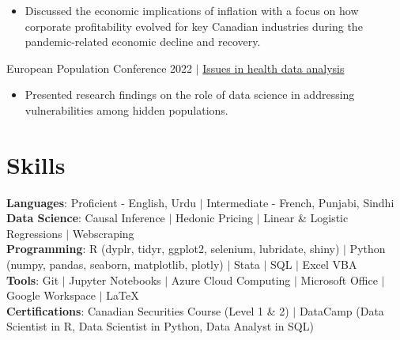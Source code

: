 \documentclass[letterpaper,11pt]{article}
\newcommand{\resumeItem}[1]{
  \item\small{
    {#1 \vspace{-2pt}}
  }
}
\newcommand{\resumeItemListStart}{\begin{itemize}}
\newcommand{\resumeItemListEnd}{\end{itemize}\vspace{-5pt}}
\begin{document}
        \resumeItemListStart
        \resumeItem{Discussed the economic implications of inflation with a focus on how corporate profitability evolved for key Canadian industries during the pandemic-related economic decline and recovery.}
        \vspace{-10pt} 
        \resumeItemListEnd 

\begin{itemize}[leftmargin=0.15in, label={}]
    {\item{
    \normalsize {European Population Conference 2022 $|$ \href{https://epc2022.eaps.nl/abstracts/210086}{Issues in health data analysis} }
    }}
\vspace{-8pt} 
\end{itemize}
 
        \resumeItemListStart
        \resumeItem{Presented research findings on the role of data science in addressing vulnerabilities among hidden populations.}
        \vspace{-10pt} 
        \resumeItemListEnd 

%
\section{Skills}
 \begin{itemize}[leftmargin=0.15in, label={}]
    {\item{
     \textbf{Languages}{: Proficient - English, Urdu $|$ Intermediate - French, Punjabi, Sindhi} \\
     \vspace{3pt}
     \textbf{Data Science}{: Causal Inference $|$ Hedonic Pricing $|$ Linear \& Logistic Regressions $|$ Webscraping} \\
     \vspace{3pt}
     \textbf{Programming}{: R (dyplr, tidyr, ggplot2, selenium, lubridate, shiny) $|$ Python (numpy, pandas, seaborn, matplotlib, plotly) $|$ Stata $|$ SQL $|$ Excel VBA} \\
     \vspace{3pt}
     \textbf{Tools}{: Git $|$ Jupyter Notebooks $|$ Azure Cloud Computing $|$ Microsoft Office $|$ Google Workspace} $|$ LaTeX \\
     \vspace{3pt}
     \textbf{Certifications}{: Canadian Securities Course (Level 1 \& 2) $|$ DataCamp (Data Scientist in R, Data Scientist in Python,  Data Analyst in SQL)}
    }}
 \end{itemize}


\end{document}
